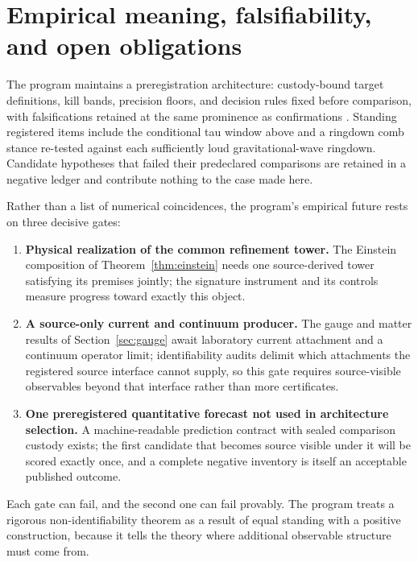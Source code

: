 \documentclass[11pt]{article}
\theoremstyle{remark}
\begin{document}
\section{Empirical meaning, falsifiability, and open obligations}
\label{sec:empirical}

The program maintains a preregistration architecture: custody-bound target
definitions, kill bands, precision floors, and decision rules fixed before
comparison, with falsifications retained at the same prominence as
confirmations \cite{ophregister}. Standing registered items include the
conditional tau window above and a ringdown comb stance re-tested against
each sufficiently loud gravitational-wave ringdown. Candidate hypotheses
that failed their predeclared comparisons are retained in a negative ledger
and contribute nothing to the case made here.

Rather than a list of numerical coincidences, the program's empirical future
rests on three decisive gates:

\begin{enumerate}[leftmargin=1.6em]
\item \textbf{Physical realization of the common refinement tower.} The
Einstein composition of Theorem~\ref{thm:einstein} needs one source-derived
tower satisfying its premises jointly; the signature instrument and its
controls measure progress toward exactly this object.
\item \textbf{A source-only current and continuum producer.} The gauge and
matter results of Section~\ref{sec:gauge} await laboratory current
attachment and a continuum operator limit; identifiability audits
delimit which attachments the registered source interface cannot supply, so
this gate requires source-visible observables beyond that interface rather
than more certificates.
\item \textbf{One preregistered quantitative forecast not used in
architecture selection.} A machine-readable prediction contract with sealed
comparison custody exists; the first candidate that becomes source visible
under it will be scored exactly once, and a complete negative inventory is
itself an acceptable published outcome.
\end{enumerate}

Each gate can fail, and the second one can fail provably. The program
treats a rigorous non-identifiability theorem as a result of equal standing
with a positive construction, because it tells the theory where additional
observable structure must come from.
\end{document}
